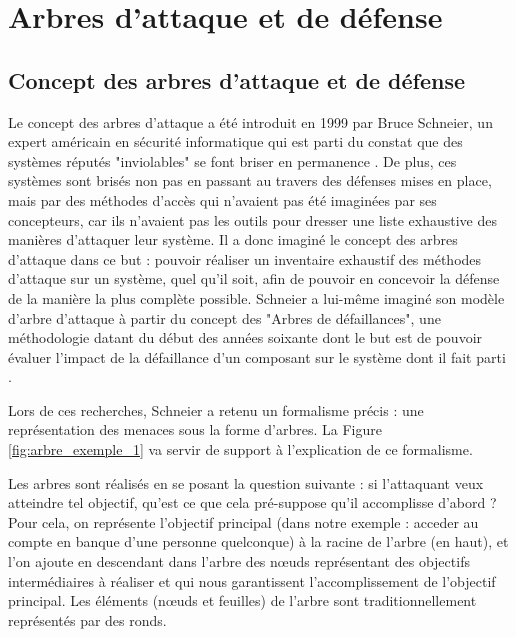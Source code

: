 \section{Arbres d'attaque et de défense}
	\label{sec:etat_art}

    \subsection{Concept des arbres d'attaque et de défense}
        Le concept des arbres d'attaque a été introduit en 1999 par Bruce Schneier, un expert américain en sécurité informatique qui est parti du constat que des systèmes réputés "inviolables" se font briser en permanence \cite{doc_Schneier}. De plus, ces systèmes sont brisés non pas en passant au travers des défenses mises en place, mais par des méthodes d'accès qui n'avaient pas été imaginées par ses concepteurs, car ils n'avaient pas les outils pour dresser une liste exhaustive des manières d'attaquer leur système. Il a donc imaginé le concept des arbres d'attaque dans ce but : pouvoir réaliser un inventaire exhaustif des méthodes d'attaque sur un système, quel qu'il soit, afin de pouvoir en concevoir la défense de la manière la plus complète possible. Schneier a lui-même imaginé son modèle d'arbre d'attaque à partir du concept des "Arbres de défaillances", une méthodologie datant du début des années soixante dont le but est de pouvoir évaluer l'impact de la défaillance d'un composant sur le système dont il fait parti \cite{defaillanceTree}. 

		Lors de ces recherches, Schneier a retenu un formalisme précis : une représentation des menaces sous la forme d'arbres. La Figure \ref{fig:arbre_exemple_1} va servir de support à l'explication de ce formalisme.

        Les arbres sont réalisés en se posant la question suivante : si l'attaquant veux atteindre tel objectif, qu'est ce que cela pré-suppose qu'il accomplisse d'abord ? Pour cela, on représente l'objectif principal (dans notre exemple : acceder au compte en banque d'une personne quelconque) à la racine de l'arbre (en haut), et l'on ajoute en descendant dans l'arbre des nœuds représentant des objectifs intermédiaires à réaliser et qui nous garantissent l'accomplissement de l'objectif principal. Les éléments (nœuds et feuilles) de l'arbre sont traditionnellement représentés par des ronds. 

